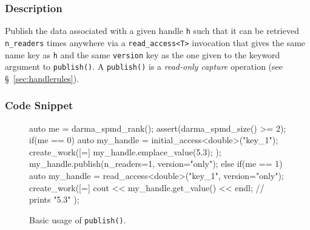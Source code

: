 \begin{subs}
\subsubsection{Description} 

Publish the data associated with a given handle \texttt{h} such that it can be
retrieved \texttt{n\_readers} times anywhere via a \texttt{read\_access<T>} invocation
that gives the same name key as \texttt{h} and the same \texttt{version} key as
the one given to the keyword argument to \texttt{publish()}.
A \texttt{publish()} is a {\it read-only capture} operation (see
\S~\ref{sec:handlerules}).

\subsubsection{Code Snippet} 
\begin{figure}[!h]
\begin{CppCodeNumb}
auto me = darma_spmd_rank();
assert(darma_spmd_size() >= 2);
if(me == 0) {
  auto my_handle = initial_access<double>("key_1");
  create_work([=]{
    my_handle.emplace_value(5.3);
  });
  my_handle.publish(n_readers=1, version="only");
}
else if(me == 1) {
  auto my_handle = read_access<double>("key_1", version="only");
  create_work([=]{
    cout << my_handle.get_value() << endl; // prints "5.3"
  });
}
\end{CppCodeNumb}
\label{fig:fe_api_initialaccess}
\caption{Basic usage of \texttt{publish()}.}
\end{figure}


\end{subs}
